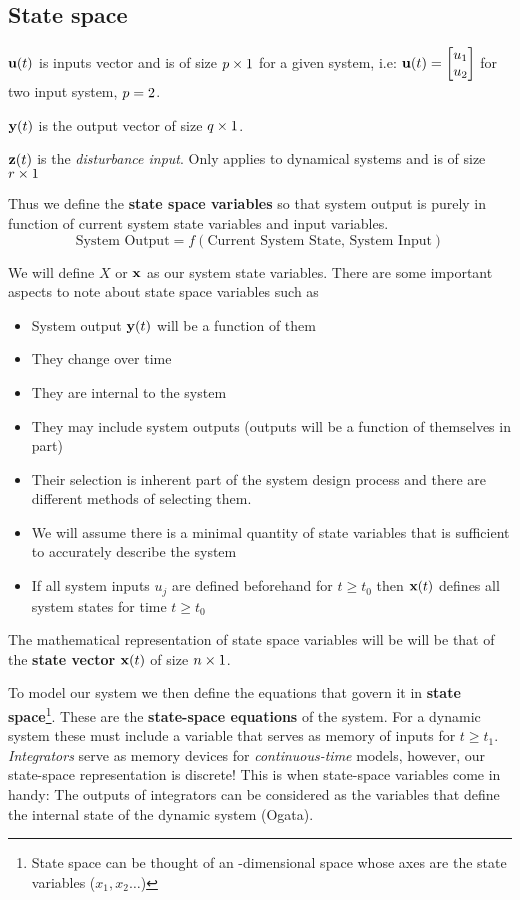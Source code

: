 \documentclass[11pt, a4paper, twoside, openright, openany]{book}
\newcommand{\dimin}{\dimfont{p}}
\newcommand{\dimout}{\dimfont{q}}
\newcommand{\dimdisturb}{\dimfont{r}}
\newcommand{\dimss}{\dimfont{n}}
\begin{document}
\subsection{State space}
\(\mathbf{u}(t)\) is inputs vector and is of size \(\dimin\times 1\) for a given system, i.e: \( \mathbf{u}(t)=\begin{bmatrix}
u_1 \\ u_2
\end{bmatrix}\) for two input system, \(\dimin=2\).

\(\mathbf{y}(t) \) is the output vector of size  \(\dimout\times 1\).

\(\mathbf{z}(t)\) is the \textit{disturbance input}. Only applies to dynamical systems and is of size \(\dimdisturb \times 1\)

Thus we define the \textbf{state space variables} so that system output is purely in function of current system state variables and input variables.
\[
\text{System Output} = f\left( \text{Current System State, System Input} \right)
\]

We will define \(X\) or \(\mathbf{x}\) as our system state variables. There are some important aspects to note about state space variables such as
\begin{itemize}
	\item System output \(\mathbf{y}(t)\) will be a function of them
	\item They change over time
	\item They are internal to the system
	\item They may include system outputs (outputs will be a function of themselves in part)
	\item Their selection is inherent part of the system design process and there are different methods of selecting them.
	\item We will assume there is a minimal quantity of state variables that is sufficient to accurately describe the system
	\item If all system inputs \(u_j\) are defined beforehand for \(t\geq t_0\) then \(\mathbf{x}(t)\) defines all system states for time \(t \geq t_0\)
\end{itemize}


The mathematical representation of state space variables will be will be that of the \textbf{state vector} \(\mathbf{x}(t)\) of size \(\dimss \times 1\).

To model our system we then define the equations that govern it in \textbf{state space}\footnote{State space can be thought of an \dimss -dimensional space whose axes are the state variables (\(x_1,x_2\ldots\))}. These are the \textbf{state-space equations} of the system. For a dynamic system these must include a variable that serves as memory of inputs for \(t \geq t_1\). \textit{Integrators} serve as memory devices for \textit{continuous-time} models, however, our state-space representation is discrete! This is when state-space variables come in handy: The outputs of integrators can be considered as the variables that define the internal state of the dynamic system (Ogata). 
\end{document}
